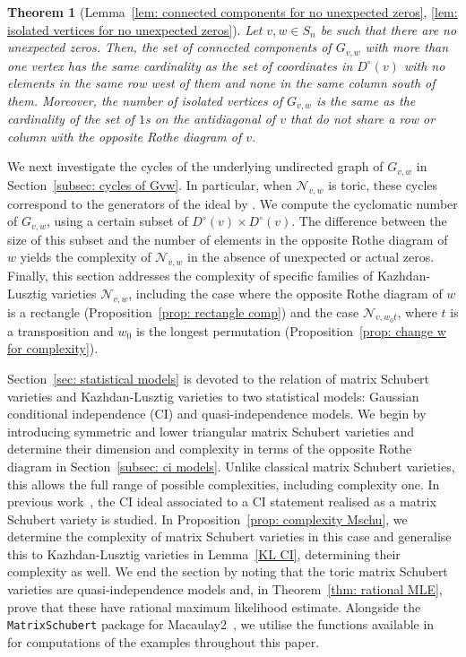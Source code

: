 \documentclass[11pt]{amsart}
\newtheorem{theorem}{Theorem}[section]
\theoremstyle{definition}
\theoremstyle{definition}
\theoremstyle{definition}
\theoremstyle{definition}
\newcommand{\Gvwt}{G_{v,w}}
\newcommand{\Dc}{D^{\circ}}
\begin{document}
\begin{theorem}[{Lemma~\ref{lem: connected components for no unexpected zeros}, \ref{lem: isolated vertices for no unexpected zeros}}]
    Let $v,w \in S_n$ be such that there are no unexpected zeros. Then, the set of connected components of $G_{v,w}$ with more than one vertex has the same cardinality as the set of 
    coordinates in $\Dc(v)$ with no elements in the same row west of them and none in the same column south of them.
    Moreover, the number of isolated vertices of $\Gvwt$ is the same as the cardinality of the set of $1$s on the antidiagonal of $v$ that do not share a row or column with the opposite Rothe diagram of $v$.
\end{theorem}
We next investigate the cycles of the underlying undirected graph of $G_{v,w}$ in Section~\ref{subsec: cycles of Gvw}. In particular, when $\mathcal{N}_{v,w}$ is toric, these cycles correspond to the generators of the ideal by \cite[Proposition 4.3]{gitler2010ring}. We compute the cyclomatic number of $G_{v,w}$, using a certain subset of $\Dc(v) \times \Dc(v)$. The difference between the size of this subset and the number of elements in the opposite Rothe diagram of $w$ yields the complexity of $\mathcal{N}_{v,w}$ in the absence of unexpected or actual zeros. Finally, this section addresses the complexity of specific families of Kazhdan-Lusztig varieties $\mathcal{N}_{v,w}$, including the case where the opposite Rothe diagram of $w$ is a rectangle (Proposition~\ref{prop: rectangle comp}) and the case $\mathcal{N}_{v, w_0 t}$, where $t$ is a transposition and $w_0$ is the longest permutation (Proposition~\ref{prop: change w for complexity}).

Section~\ref{sec: statistical models} is devoted to the relation of matrix Schubert varieties and Kazhdan-Lusztig varieties to two statistical models: Gaussian conditional independence (CI) and quasi-independence models. We begin by introducing symmetric and lower triangular matrix Schubert varieties and determine their dimension and complexity in terms of the opposite Rothe diagram in Section~\ref{subsec: ci models}. Unlike classical matrix Schubert varieties, this allows the full range of possible complexities, including complexity one. In previous work~\cite{fink2016matrix}, the CI ideal associated to a CI statement realised as a matrix Schubert variety is studied. In Proposition~\ref{prop: complexity Mschu}, we determine the complexity of matrix Schubert varieties in this case and generalise this to Kazhdan-Lusztig varieties in Lemma~\ref{KL CI}, determining their complexity as well. We end the section by noting that the toric matrix Schubert varieties are quasi-independence models and, in Theorem~\ref{thm: rational MLE}, prove that these have rational maximum likelihood estimate. Alongside the \texttt{MatrixSchubert} package for Macaulay2~\cite{almousa2025matrixschubert}, we utilise the functions available in~\cite{NiharikaCP_KLvarieties} for computations of the examples throughout this paper.
\end{document}

